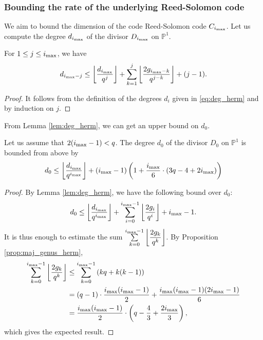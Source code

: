 \documentclass[10pt,a4paper]{article}
\newcommand{\cd}{\cdot}
\newcommand{\ii}{i_{\rm{max}}}
\theoremstyle{plain}
\theoremstyle{plain}
\theoremstyle{definition}
\theoremstyle{remark}
\theoremstyle{plain}
\begin{document}
\subsubsection{Bounding the rate of the underlying Reed-Solomon code}

We aim to bound the dimension of the code Reed-Solomon code $C_{\ii}$. Let us compute the degree $d_{\ii}$ of the divisor $D_{\ii}$ on $\mathbb{P}^1$.

\begin{lemma}\label{lem:deg_herm}
	For $1 \leq j \leq \ii$, we have 
	\[d_{\ii -j} \leq \left\lfloor \dfrac{d_{\ii}}{q^j}\right\rfloor + \sum\limits_{k=1}^j \left\lfloor \dfrac{2g_{\ii -k}}{q^{j-k}}\right\rfloor + (j-1).\] 
\end{lemma}

\begin{proof}
	It follows from the definition of the degrees $d_i$ given in \eqref{eq:deg_herm} and by induction on $j$.
\end{proof}

From Lemma \ref{lem:deg_herm}, we can get an upper bound on $d_0$.

\begin{corollary}
	Let us assume that $2(\ii-1) < q$.
	The degree $d_0$ of the divisor $D_0$ on $\mathbb{P}^1$ is bounded from above by 
	\[d_0 \leq \left\lfloor \dfrac{d_{\ii}}{q^{\ii}}\right\rfloor + (\ii-1)\left( 1+\frac{\ii}{6} \cd \left(3q-4 + 2\ii\right) \right) \]
\end{corollary}

\begin{proof}
	By Lemma \ref{lem:deg_herm}, we have the following bound over $d_0$:
	\[d_0 \leq \left\lfloor \dfrac{d_{\ii}}{q^{\ii}}\right\rfloor + \sum\limits_{i=0}^{\ii-1} \left\lfloor \dfrac{2g_i}{q^{i}}\right\rfloor + \ii-1.\]
	It is thus enough to estimate the sum $\sum\limits_{k=0}^{\ii-1} \left\lfloor \dfrac{2g_k}{q^k}\right\rfloor$. By Proposition \ref{prop:maj_genus_herm},
	\begin{align*}
		\sum\limits_{k=0}^{\ii-1} \left\lfloor \dfrac{2g_k}{q^k}\right\rfloor & \leq  \sum\limits_{k=0}^{\ii-1} \left(kq + k(k-1)\right)  \\
		&= (q-1) \cd \dfrac{\ii(\ii-1)}{2} + \dfrac{\ii(\ii-1)(2\ii-1)}{6} \\
		&= \dfrac{\ii(\ii-1)}{2}\cd \left(q-\frac{4}{3} + \frac{2\ii}{3}\right),
	\end{align*}
	which gives the expected result.
\end{proof}
\end{document}
